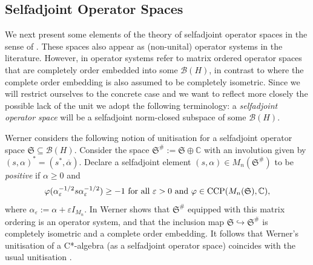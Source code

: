 \documentclass[11pt, draft]{amsart}
\numberwithin{equation}{section}
\theoremstyle{plain}
\theoremstyle{definition}
\theoremstyle{remark}
\newcommand{\B}{{\mathcal{B}}}
\newcommand{\eps}{\varepsilon}
\def\al{\alpha}
\newcommand\vphi{\varphi}
\newcommand{\bC}{\mathbb{C}}
\newcommand{\fS}{{\mathfrak{S}}}
\newcommand{\foral}{\text{ for all }}
\newcommand{\ol}{\overline}
\begin{document}
\subsection{Selfadjoint Operator Spaces}

We next present some elements of the theory of selfadjoint operator spaces in the sense of \cite{CS21, KKM23, Wer02}. These spaces also appear as (non-unital) operator systems in the literature. 
However, in \cite{Wer02} operator systems refer to matrix ordered operator spaces that are completely order embedded into some $\B(H)$, in contrast to \cite{CS21, KKM23} where the complete order embedding is also assumed to be completely isometric. 
Since we will restrict ourselves to the concrete case and we want to reflect more closely the possible lack of the unit we adopt the following terminology: a \emph{selfadjoint operator space} will be a selfadjoint norm-closed subspace of some $\B(H)$.

Werner \cite[Definition 4.7]{Wer02} considers the following notion of unitisation for a selfadjoint operator space $\fS \subseteq \B(H)$.
Consider the space $\fS^{\#} := \fS \oplus \bC$ with an involution given by $(s,\al)^*=(s^*,\ol{\al})$.
Declare a selfadjoint element $(s,\al) \in M_n(\fS^{\#})$ to be \emph{positive} if $\al \geq 0$ and 
\[
\vphi(\al_\varepsilon^{-1/2}s\al_\varepsilon^{-1/2})\geq -1 \foral \eps>0 \text{ and } \vphi \in {\rm CCP}(M_n(\fS), \bC),
\]
where $\al_\varepsilon:=\al+\varepsilon I_{M_n}$.
In \cite[Lemma 4.8]{Wer02} Werner shows that $\fS^{\#}$ equipped with this matrix ordering is an operator system, and that the inclusion map $\fS \hookrightarrow \fS^{\#}$ is completely isometric and a complete order embedding.
It follows that Werner's unitisation of a C*-algebra (as a selfadjoint operator space) coincides with the usual unitisation \cite[Corollary 4.17]{Wer02}.
\end{document}
